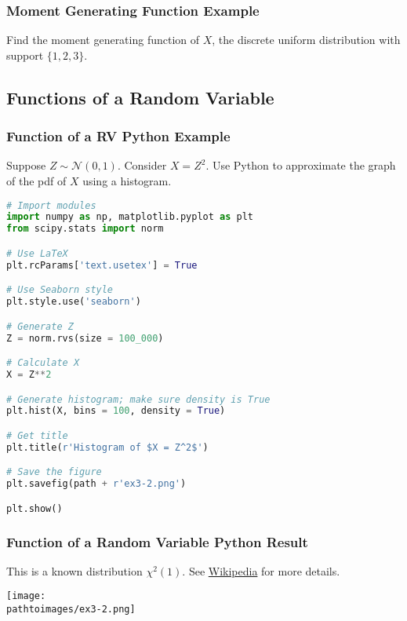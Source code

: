 \documentclass{beamer}
\newcommand{\pathtoimages}{/Users/charlesrambo/Desktop/Bootcamp24/Images}
\begin{document}
\begin{frame}[t]
\frametitle{Moment Generating Function Example}
\begin{Example}
Find the moment generating function of $X$, the discrete uniform distribution with support $\{1, 2, 3\}$.
\end{Example}

\end{frame}

\subsection{Functions of a Random Variable}

\begin{frame}[fragile]
\frametitle{Function of a RV Python Example}
\small
\begin{Example}
Suppose $Z\sim{\mathcal{N}(0, 1)}$. Consider $X = Z^2$. Use Python to approximate the graph of the pdf of $X$ using a histogram. 
\end{Example}

\begin{lstlisting}[language=Python]
# Import modules
import numpy as np, matplotlib.pyplot as plt
from scipy.stats import norm

# Use LaTeX
plt.rcParams['text.usetex'] = True

# Use Seaborn style
plt.style.use('seaborn')

# Generate Z
Z = norm.rvs(size = 100_000)

# Calculate X
X = Z**2

# Generate histogram; make sure density is True
plt.hist(X, bins = 100, density = True)

# Get title 
plt.title(r'Histogram of $X = Z^2$')

# Save the figure
plt.savefig(path + r'ex3-2.png')

plt.show()
\end{lstlisting}
\end{frame}

\begin{frame}
\frametitle{Function of a Random Variable Python Result}
\small 
This is a known distribution $\chi^2(1)$. See \href{https://en.wikipedia.org/wiki/Chi-squared_distribution}{Wikipedia} for more details. 
\begin{center}
\texttt{[image: \\pathtoimages/ex3-2.png]}
\end{center}

\end{frame}
\end{document}
